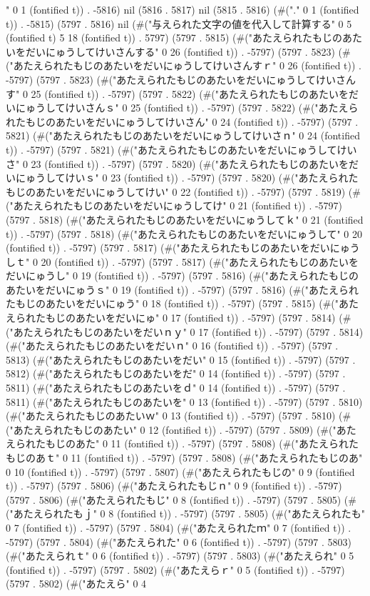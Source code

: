 " 0 1 (fontified t)) . -5816) nil (5816 . 5817) nil (5815 . 5816) (#("." 0 1 (fontified t)) . -5815) (5797 . 5816) nil (#("与えられた文字の値を代入して計算する" 0 5 (fontified t) 5 18 (fontified t)) . 5797) (5797 . 5815) (#("あたえられたもじのあたいをだいにゅうしてけいさんする" 0 26 (fontified t)) . -5797) (5797 . 5823) (#("あたえられたもじのあたいをだいにゅうしてけいさんすｒ" 0 26 (fontified t)) . -5797) (5797 . 5823) (#("あたえられたもじのあたいをだいにゅうしてけいさんす" 0 25 (fontified t)) . -5797) (5797 . 5822) (#("あたえられたもじのあたいをだいにゅうしてけいさんｓ" 0 25 (fontified t)) . -5797) (5797 . 5822) (#("あたえられたもじのあたいをだいにゅうしてけいさん" 0 24 (fontified t)) . -5797) (5797 . 5821) (#("あたえられたもじのあたいをだいにゅうしてけいさｎ" 0 24 (fontified t)) . -5797) (5797 . 5821) (#("あたえられたもじのあたいをだいにゅうしてけいさ" 0 23 (fontified t)) . -5797) (5797 . 5820) (#("あたえられたもじのあたいをだいにゅうしてけいｓ" 0 23 (fontified t)) . -5797) (5797 . 5820) (#("あたえられたもじのあたいをだいにゅうしてけい" 0 22 (fontified t)) . -5797) (5797 . 5819) (#("あたえられたもじのあたいをだいにゅうしてけ" 0 21 (fontified t)) . -5797) (5797 . 5818) (#("あたえられたもじのあたいをだいにゅうしてｋ" 0 21 (fontified t)) . -5797) (5797 . 5818) (#("あたえられたもじのあたいをだいにゅうして" 0 20 (fontified t)) . -5797) (5797 . 5817) (#("あたえられたもじのあたいをだいにゅうしｔ" 0 20 (fontified t)) . -5797) (5797 . 5817) (#("あたえられたもじのあたいをだいにゅうし" 0 19 (fontified t)) . -5797) (5797 . 5816) (#("あたえられたもじのあたいをだいにゅうｓ" 0 19 (fontified t)) . -5797) (5797 . 5816) (#("あたえられたもじのあたいをだいにゅう" 0 18 (fontified t)) . -5797) (5797 . 5815) (#("あたえられたもじのあたいをだいにゅ" 0 17 (fontified t)) . -5797) (5797 . 5814) (#("あたえられたもじのあたいをだいｎｙ" 0 17 (fontified t)) . -5797) (5797 . 5814) (#("あたえられたもじのあたいをだいｎ" 0 16 (fontified t)) . -5797) (5797 . 5813) (#("あたえられたもじのあたいをだい" 0 15 (fontified t)) . -5797) (5797 . 5812) (#("あたえられたもじのあたいをだ" 0 14 (fontified t)) . -5797) (5797 . 5811) (#("あたえられたもじのあたいをｄ" 0 14 (fontified t)) . -5797) (5797 . 5811) (#("あたえられたもじのあたいを" 0 13 (fontified t)) . -5797) (5797 . 5810) (#("あたえられたもじのあたいｗ" 0 13 (fontified t)) . -5797) (5797 . 5810) (#("あたえられたもじのあたい" 0 12 (fontified t)) . -5797) (5797 . 5809) (#("あたえられたもじのあた" 0 11 (fontified t)) . -5797) (5797 . 5808) (#("あたえられたもじのあｔ" 0 11 (fontified t)) . -5797) (5797 . 5808) (#("あたえられたもじのあ" 0 10 (fontified t)) . -5797) (5797 . 5807) (#("あたえられたもじの" 0 9 (fontified t)) . -5797) (5797 . 5806) (#("あたえられたもじｎ" 0 9 (fontified t)) . -5797) (5797 . 5806) (#("あたえられたもじ" 0 8 (fontified t)) . -5797) (5797 . 5805) (#("あたえられたもｊ" 0 8 (fontified t)) . -5797) (5797 . 5805) (#("あたえられたも" 0 7 (fontified t)) . -5797) (5797 . 5804) (#("あたえられたｍ" 0 7 (fontified t)) . -5797) (5797 . 5804) (#("あたえられた" 0 6 (fontified t)) . -5797) (5797 . 5803) (#("あたえられｔ" 0 6 (fontified t)) . -5797) (5797 . 5803) (#("あたえられ" 0 5 (fontified t)) . -5797) (5797 . 5802) (#("あたえらｒ" 0 5 (fontified t)) . -5797) (5797 . 5802) (#("あたえら" 0 4 